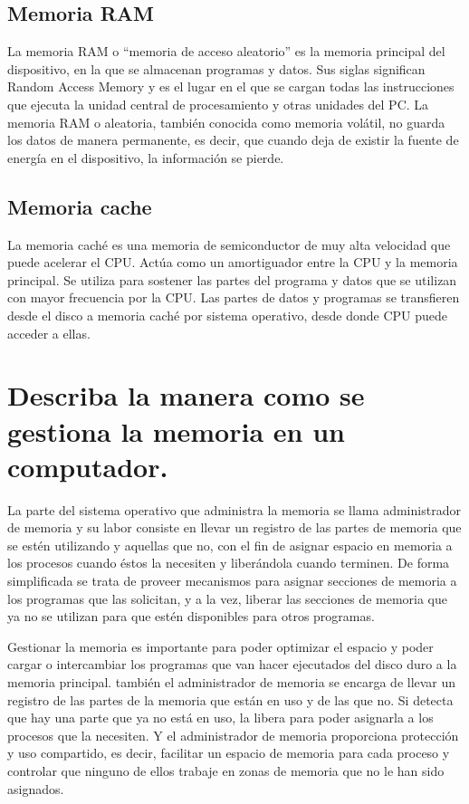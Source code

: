 \documentclass[a4paper]{article}
\begin{document}
\subsection{Memoria RAM}

La memoria RAM o “memoria de acceso aleatorio” es la memoria principal del dispositivo, en la que se almacenan programas y datos. Sus siglas significan Random Access Memory y es el lugar en el que se cargan todas las instrucciones que ejecuta la unidad central de procesamiento y otras unidades del PC. La memoria RAM o aleatoria, también conocida como memoria volátil, no guarda los datos de manera permanente, es decir, que cuando deja de existir la fuente de energía en el dispositivo, la información se pierde.

\subsection{Memoria cache}

La memoria caché es una memoria de semiconductor de muy alta velocidad que puede acelerar el CPU. Actúa como un amortiguador entre la CPU y la memoria principal. Se utiliza para sostener las partes del programa y datos que se utilizan con mayor frecuencia por la CPU. Las partes de datos y programas se transfieren desde el disco a memoria caché por sistema operativo, desde donde CPU puede acceder a ellas.

\section{Describa la manera como se gestiona la memoria en un computador.}

La parte del sistema operativo que administra la memoria se llama administrador de memoria y su labor consiste en llevar un registro de las partes de memoria que se estén utilizando y aquellas que no, con el fin de asignar espacio en memoria a los procesos cuando éstos la necesiten y liberándola cuando terminen. De forma simplificada se trata de proveer mecanismos para asignar secciones de memoria a los programas que las solicitan, y a la vez, liberar las secciones de memoria que ya no se utilizan para que estén disponibles para otros programas.

Gestionar la memoria es importante para poder optimizar el espacio y poder cargar o intercambiar los programas que van hacer ejecutados del disco duro a la memoria principal. también el administrador de memoria se encarga de llevar un registro de las partes de la memoria que están en uso y de las que no. Si detecta que hay una parte que ya no está en uso, la libera para poder asignarla a los procesos que la necesiten. Y el administrador de memoria proporciona  protección y uso compartido, es decir, facilitar un espacio de memoria para cada proceso y controlar que ninguno de ellos trabaje en zonas de memoria que no le han sido asignados.
\end{document}
